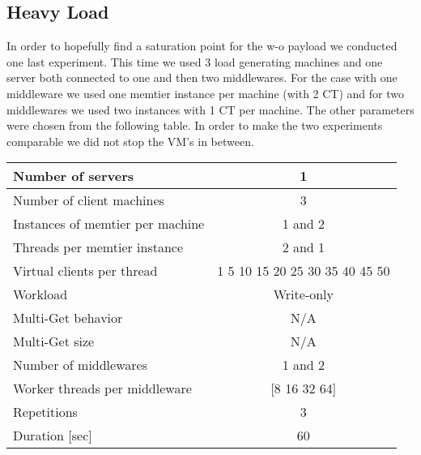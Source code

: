 \documentclass[11pt,a4paper]{article}
\begin{document}
\subsection{Heavy Load}\label{sub:heavy_load}
In order to hopefully find a saturation point for the w-o payload we conducted one last experiment. This time we used 3 load generating machines and one server both connected to one and then two middlewares. For the case with one middleware we used one memtier instance per machine (with 2 CT) and for two middlewares we used two instances with 1 CT per machine. The other parameters were chosen from the following table. In order to make the two experiments comparable we did not stop the VM's in between.

\begin{table}[!ht]
\begin{center}
	\scriptsize{
		\begin{tabular}{|l|c|}
			\hline Number of servers                & 1                        \\ 
			\hline Number of client machines        & 3                        \\ 
			\hline Instances of memtier per machine & 1 and 2                        \\ 
			\hline Threads per memtier instance     & 2 and 1                  \\
			\hline Virtual clients per thread       & 1 5 10 15 20 25 30 35 40 45 50                  \\ 
			\hline Workload                         & Write-only \\
			\hline Multi-Get behavior               & N/A                      \\
			\hline Multi-Get size                   & N/A                      \\
			\hline Number of middlewares            & 1 and 2                        \\
			\hline Worker threads per middleware    & [8 16 32 64]                  \\
			\hline Repetitions                      & 3               \\ 
			\hline Duration [sec]                      & 60              \\
			\hline 
		\end{tabular}
	} 
\end{center}
\end{table}
\end{document}
